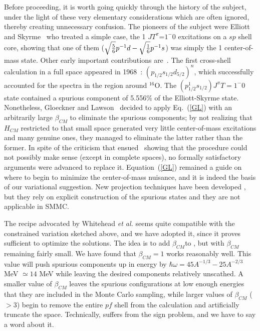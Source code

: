 \begin{multicols}{2}
Before proceeding, it is worth going quickly through the history of
the subject, under the light of these very elementary considerations
which are often ignored, thereby creating unnecessary confusion.  The
pioneers of the subject were Elliott and Skyrme~\cite{es} who treated
a simple case, the 1 \hw $JT^{\pi}$=$1^-0$ excitations on a $sp$ shell
core, showing that one of them ($\sqrt{5\over 6}p^{-1}d-\sqrt{1\over
  6}p^{-1}s$) was simply the 1 \hw center-of-mass state. Other early important
contributions are~\cite{gs57,r:baranger}.  The first
cross-shell calculation in a full space appeared
in 1968~\cite{zbm}: $(p_{1/2}s_{1/2}d_{5/2})^n$, which
successfully accounted for the
spectra in the region around $^{16}$O.
The $(p_{1/2}^{1}s_{1/2})J^{\pi}T=1^-0$ state contained a spurious
component of 5.556\% of the Elliott-Skyrme state.  Nonetheless, Gloeckner and
Lawson~\cite{r:gloeckner} decided to apply Eq.~(\ref{GL}) with an
arbitrarily large $\beta_{CM}$ to eliminate the spurious components; by not
realizing that $H_{CM}$ restricted to that small space generated very
little center-of-mass excitations and many genuine ones, they managed to
eliminate the latter rather than the former. In spite of the criticism
that ensued~\cite{r:mcgrory,r:whitehead} showing that the procedure
could not possibly make sense (except in complete spaces), no
formally satisfactory arguments were advanced to replace it.
Equation~(\ref{GL}) remained a guide on where to begin to
minimize the center-of-mass nuisance, and it is indeed the basis of our
variational suggestion. New projection techniques have been developed
\cite{r:rath}, but they rely on explicit construction of the spurious
states and they are not applicable in SMMC.

The recipe advocated by Whitehead {\it et al.}  \cite{r:whitehead}
seems quite compatible with the constrained variation sketched above,
and we have adopted it, since it proves sufficient to optimize the
solutions. The idea is to add $\beta_{CM}$\hcm to \ham,  but with
$\beta_{CM}$ remaining fairly small.  We have found that $\beta_{CM} =
1$ works reasonably well.  This value will push spurious components up
in energy by $\hbar\omega = 45 A^{-1/3} - 25 A^{-2/3}$ MeV $\simeq 14$
MeV while leaving the desired components relatively unscathed.  A
smaller value of $\beta_{CM}$ leaves the spurious configurations at
low enough energies that they are included in the Monte Carlo
sampling, while larger values of $\beta_{CM}$ ($>3$) begin to remove
the entire $pf$ shell from the calculation and artificially truncate
the space. Technically, \hcm suffers from the sign problem, and we
have to say a word about it.


\end{multicols}
